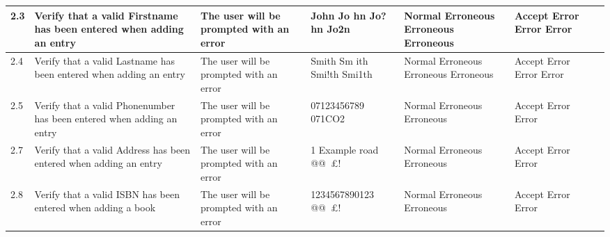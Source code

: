 \begin{landscape}
\begin{center}
\begin{longtable}{|p{1.5cm}|p{2cm}|p{2.5cm}|p{2.5cm}|p{2cm}|p{2cm}|p{2cm}|p{2cm}|}
        2.3 & Verify that a valid Firstname has been entered when adding an entry & The user will be prompted with an error & John \newline Jo hn \newline Jo?hn \newline Jo2n & Normal \newline Erroneous \newline Erroneous \newline Erroneous & Accept \newline Error \newline Error \newline Error & & \\ \hline
        2.4 & Verify that a valid Lastname has been entered when adding an entry & The user will be prompted with an error & Smith \newline Sm ith \newline Smi!th \newline Smi1th & Normal \newline Erroneous \newline Erroneous \newline Erroneous & Accept \newline Error \newline Error \newline Error & & \\ \hline
        2.5 & Verify that a valid Phonenumber has been entered when adding an entry & The user will be prompted with an error & 07123456789 \newline 07123123.3 \newline 071CO2 & Normal \newline Erroneous \newline Erroneous & Accept \newline Error \newline Error & & \\ \hline
        2.7 & Verify that a valid Address has been entered when adding an entry & The user will be prompted with an error & 1 Example road \newline @@~£! \newline 1231231 & Normal \newline Erroneous \newline Erroneous & Accept \newline Error \newline Error & & \\ \hline
\rowcolor{lightgray} 2.8 & Verify that a valid ISBN has been entered when adding a book & The user will be prompted with an error & 1234567890123 \newline @@~£! \newline 1234567890123456 & Normal \newline Erroneous \newline Erroneous & Accept \newline Error \newline Error & & \\ \hline

\end{longtable}
\end{center}
\end{landscape}
